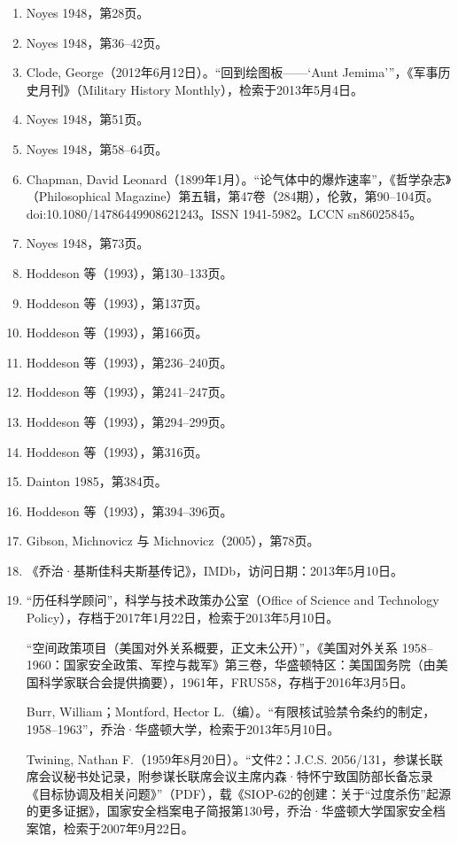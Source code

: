 \begin{enumerate}
\item Noyes 1948，第28页。
\item Noyes 1948，第36–42页。
\item Clode, George（2012年6月12日）。“回到绘图板——‘Aunt Jemima’”，《军事历史月刊》（Military History Monthly），检索于2013年5月4日。
\item Noyes 1948，第51页。
\item Noyes 1948，第58–64页。
\item Chapman, David Leonard（1899年1月）。“论气体中的爆炸速率”，《哲学杂志》（Philosophical Magazine）第五辑，第47卷（284期），伦敦，第90–104页。doi:10.1080/14786449908621243。ISSN 1941-5982。LCCN sn86025845。
\item Noyes 1948，第73页。
\item Hoddeson 等（1993），第130–133页。
\item Hoddeson 等（1993），第137页。
\item Hoddeson 等（1993），第166页。
\item Hoddeson 等（1993），第236–240页。
\item Hoddeson 等（1993），第241–247页。
\item Hoddeson 等（1993），第294–299页。
\item Hoddeson 等（1993），第316页。
\item Dainton 1985，第384页。
\item Hoddeson 等（1993），第394–396页。
\item Gibson, Michnovicz 与 Michnovicz（2005），第78页。
\item 《乔治·基斯佳科夫斯基传记》，IMDb，访问日期：2013年5月10日。
\item “历任科学顾问”，科学与技术政策办公室（Office of Science and Technology Policy），存档于2017年1月22日，检索于2013年5月10日。

“空间政策项目（美国对外关系概要，正文未公开）”，《美国对外关系 1958–1960：国家安全政策、军控与裁军》第三卷，华盛顿特区：美国国务院（由美国科学家联合会提供摘要），1961年，FRUS58，存档于2016年3月5日。

Burr, William；Montford, Hector L.（编）。“有限核试验禁令条约的制定，1958–1963”，乔治·华盛顿大学，检索于2013年5月10日。

Twining, Nathan F.（1959年8月20日）。“文件2：J.C.S. 2056/131，参谋长联席会议秘书处记录，附参谋长联席会议主席内森·特怀宁致国防部长备忘录《目标协调及相关问题》”（PDF），载《SIOP-62的创建：关于“过度杀伤”起源的更多证据》，国家安全档案电子简报第130号，乔治·华盛顿大学国家安全档案馆，检索于2007年9月22日。


\end{enumerate}
